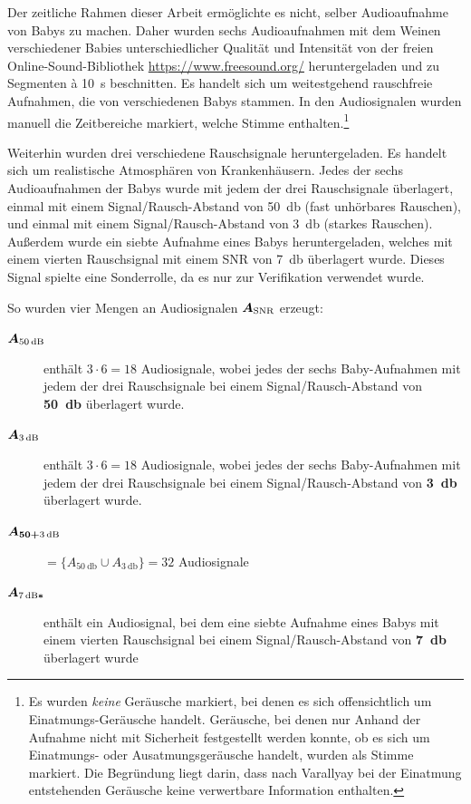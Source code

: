 Der zeitliche Rahmen dieser Arbeit ermöglichte es nicht, selber Audioaufnahme von Babys zu machen. Daher wurden sechs Audioaufnahmen mit dem Weinen verschiedener Babies unterschiedlicher Qualität und Intensität von der freien Online-Sound-Bibliothek \url{https://www.freesound.org/} heruntergeladen und zu Segmenten \`{a} \SI{10}{\second} beschnitten. Es handelt sich um weitestgehend rauschfreie Aufnahmen, die von verschiedenen Babys stammen. In den Audiosignalen wurden manuell die Zeitbereiche markiert, welche Stimme enthalten.\footnote{Es wurden \emph{keine} Geräusche markiert, bei denen es sich offensichtlich um Einatmungs-Geräusche handelt. Geräusche, bei denen nur Anhand der Aufnahme nicht mit Sicherheit festgestellt werden konnte, ob es sich um Einatmungs- oder Ausatmungsgeräusche handelt, wurden als Stimme markiert. Die Begründung liegt darin, dass nach Varallyay \cite{cry_thesis} bei der Einatmung entstehenden Geräusche keine verwertbare Information enthalten. }

Weiterhin wurden drei verschiedene Rauschsignale heruntergeladen. Es handelt sich um \glqq realistische\grqq{} Atmosphären von Krankenhäusern. Jedes der sechs Audioaufnahmen der Babys wurde mit jedem der drei Rauschsignale überlagert, einmal mit einem Signal/Rausch-Abstand von \SI{50}{\decibel} (\glqq fast unhörbares Rauschen\grqq), und einmal mit einem Signal/Rausch-Abstand von \SI{3}{\decibel} (\glqq starkes Rauschen\grqq). Außerdem wurde ein siebte Aufnahme eines Babys heruntergeladen, welches mit einem vierten Rauschsignal mit einem SNR von \SI{7}{\decibel} überlagert wurde. Dieses Signal spielte eine Sonderrolle, da es nur zur Verifikation verwendet wurde. 

So wurden vier Mengen an Audiosignalen $\boldmath{A_{\text{SNR}}}$ erzeugt:

\begin{description}
	\item[$\boldmath{A_{\SI{50}{\decibel}}}$] enthält $3 \cdot 6 = 18$ Audiosignale, wobei jedes der sechs Baby-Aufnahmen mit jedem der drei Rauschsignale bei einem Signal/Rausch-Abstand von \textbf{\SI{50}{\decibel}} überlagert wurde.

	\item[$\boldmath{A_{\SI{3}{\decibel}}}$] enthält $3 \cdot 6 = 18$ Audiosignale, wobei jedes der sechs Baby-Aufnahmen mit jedem der drei Rauschsignale bei einem Signal/Rausch-Abstand von \textbf{\SI{3}{\decibel}} überlagert wurde.
	
	\item[$\boldmath{A_{50+\SI{3}{\decibel}}}$] $ = \{ A_{\SI{50}{\decibel}} \cup  A_{\SI{3}{\decibel}}\} = 32$ Audiosignale
	
	\item[$\boldmath{A_{\SI{7}{\decibel}*}}$] enthält ein Audiosignal, bei dem eine siebte Aufnahme eines Babys mit einem vierten Rauschsignal bei einem Signal/Rausch-Abstand von \textbf{\SI{7}{\decibel}} überlagert wurde
	
\end{description}


